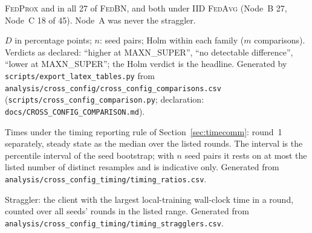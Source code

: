 \documentclass[journal]{IEEEtran}
\newcommand{\fedavg}{\textsc{FedAvg}}
\newcommand{\fedprox}{\textsc{FedProx}}
\newcommand{\fedbn}{\textsc{FedBN}}
\begin{document}
\fedprox{} and in all 27 of \fedbn{}, and both under IID \fedavg{} (Node~B 27, Node~C 18 of 45). Node~A was never the straggler.

\begin{table}[t]
\centering
\caption{Power Configurations: MAXN\_SUPER Minus Main Matrix, Balanced Accuracy Pooled Over the Test Splits (Seed-Paired, Sequence Bootstrap $B=10{,}000$)}
\label{tab:powercfg_acc}
\setlength{\tabcolsep}{3pt}
{\footnotesize
}
\vspace{2pt}
\parbox{\textwidth}{\footnotesize $D$ in percentage points; $n$: seed pairs; Holm within each family ($m$ comparisons). Verdicts as declared: ``higher at MAXN\_SUPER'', ``no detectable difference'', ``lower at MAXN\_SUPER''; the Holm verdict is the headline. Generated by \texttt{scripts/export\_latex\_tables.py} from \texttt{analysis/cross\_config/cross\_config\_comparisons.csv} (\texttt{scripts/cross\_config\_comparison.py}; declaration: \texttt{docs/CROSS\_CONFIG\_COMPARISON.md}).}
\end{table}

\begin{table}[t]
\centering
\caption{Power Configurations: Seed-Paired Ratio of Per-Run Times, MAXN\_SUPER Over Main Matrix (Geometric Mean Over Seeds; Descriptive, No Verdicts)}
\label{tab:powercfg_time}
{\footnotesize
}
\vspace{2pt}
\parbox{\textwidth}{\footnotesize Times under the timing reporting rule of Section~\ref{sec:timecomm}: round~1 separately, steady state as the median over the listed rounds. The interval is the percentile interval of the seed bootstrap; with $n$ seed pairs it rests on at most the listed number of distinct resamples and is indicative only. Generated from \texttt{analysis/cross\_config\_timing/timing\_ratios.csv}.}
\end{table}

\begin{table}[t]
\centering
\caption{Power Configurations: Rounds in Which Each Node Finished Local Training Last}
\label{tab:powercfg_straggler}
\setlength{\tabcolsep}{2pt}
{\footnotesize
}
\vspace{2pt}
\footnotesize{Straggler: the client with the largest local-training wall-clock time in a round, counted over all seeds' rounds in the listed range. Generated from \texttt{analysis/cross\_config\_timing/timing\_stragglers.csv}.}
\end{table}
\end{document}
